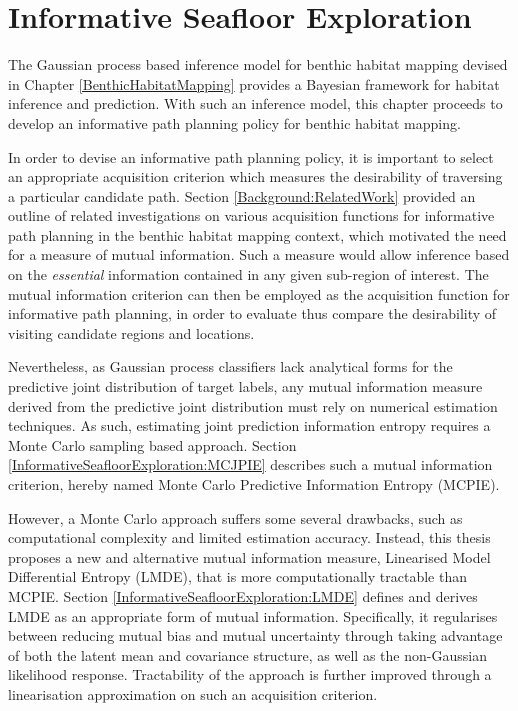 \chapter{Informative Seafloor Exploration}
\label{InformativeSeafloorExploration}

	The Gaussian process based inference model for benthic habitat mapping devised in Chapter \ref{BenthicHabitatMapping} provides a Bayesian framework for habitat inference and prediction. With such an inference model, this chapter proceeds to develop an informative path planning policy for benthic habitat mapping.
	
	In order to devise an informative path planning policy, it is important to select an appropriate acquisition criterion which measures the desirability of traversing a particular candidate path. Section \ref{Background:RelatedWork} provided an outline of related investigations on various acquisition functions for informative path planning in the benthic habitat mapping context, which motivated the need for a measure of mutual information. Such a measure would allow inference based on the \textit{essential} information contained in any given sub-region of interest. The mutual information criterion can then be employed as the acquisition function for informative path planning, in order to evaluate thus compare the desirability of visiting candidate regions and locations.
	
	Nevertheless, as Gaussian process classifiers lack analytical forms for the predictive joint distribution of target labels, any mutual information measure derived from the predictive joint distribution must rely on numerical estimation techniques. As such, estimating joint prediction information entropy requires a Monte Carlo sampling based approach. Section \ref{InformativeSeafloorExploration:MCJPIE} describes such a mutual information criterion, hereby named Monte Carlo Predictive Information Entropy (MCPIE).
	
	However, a Monte Carlo approach suffers some several drawbacks, such as computational complexity and limited estimation accuracy. Instead, this thesis proposes a new and alternative mutual information measure, Linearised Model Differential Entropy (LMDE), that is more computationally tractable than MCPIE. Section \ref{InformativeSeafloorExploration:LMDE} defines and derives LMDE as an appropriate form of mutual information. Specifically, it regularises between reducing mutual bias and mutual uncertainty through taking advantage of both the latent mean and covariance structure, as well as the non-Gaussian likelihood response. Tractability of the approach is further improved through a linearisation approximation on such an acquisition criterion.
	
